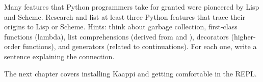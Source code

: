 \begin{exercise}
Many features that Python programmers take for granted were pioneered by Lisp and Scheme. Research and list at least three Python features that trace their origins to Lisp or Scheme. Hints: think about garbage collection, first-class functions (lambda), list comprehensions (derived from  and ), decorators (higher-order functions), and generators (related to continuations). For each one, write a sentence explaining the connection.
\end{exercise}

The next chapter covers installing Kaappi and getting comfortable in the REPL.

\chapterend
